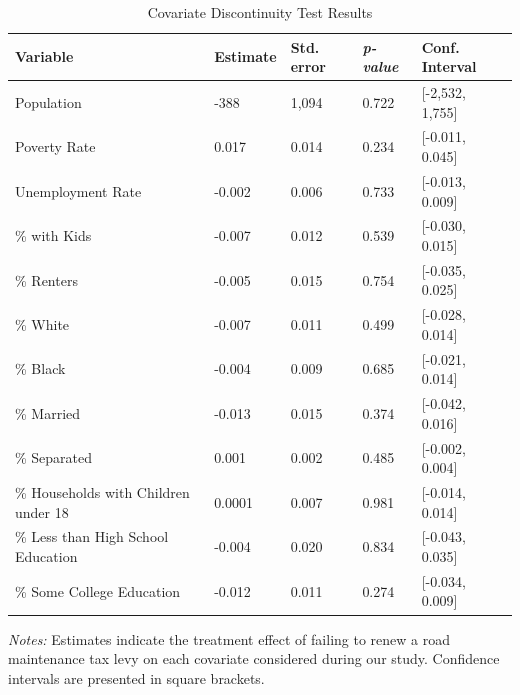 \begin{table}[!h]
    \centering
    \caption{Covariate Discontinuity Test Results}
    \label{tab:covariate_discontinuity}
    \begin{tabularx}{\textwidth}{p{4cm}*{3}{X}X}
          \hline
          Variable & Estimate & Std. error & \textit{p-value} & Conf. Interval \\
          \hline
          \renewcommand{\arraystretch}{1.5}
        Population                           & -388      & 1,094   & 0.722  & [-2,532, 1,755] \\
        Poverty Rate                         & 0.017     & 0.014   & 0.234  & [-0.011, 0.045] \\
        Unemployment Rate                 & -0.002    & 0.006   & 0.733  & [-0.013, 0.009] \\
        \% with Kids                         & -0.007    & 0.012   & 0.539  & [-0.030, 0.015] \\
        \% Renters                           & -0.005    & 0.015   & 0.754  & [-0.035, 0.025] \\
        \% White                             & -0.007    & 0.011   & 0.499  & [-0.028, 0.014] \\
        \% Black                             & -0.004    & 0.009   & 0.685  & [-0.021, 0.014] \\
        \% Married                           & -0.013    & 0.015   & 0.374  & [-0.042, 0.016] \\
        \% Separated                         & 0.001     & 0.002   & 0.485  & [-0.002, 0.004] \\
        \% Households with Children under 18 & 0.0001    & 0.007   & 0.981  & [-0.014, 0.014] \\
        \% Less than High School Education   & -0.004    & 0.020   & 0.834  & [-0.043, 0.035] \\
        \% Some College Education            & -0.012    & 0.011   & 0.274  & [-0.034, 0.009] \\
        \hline
    \end{tabularx}
    \begin{tablenotes}
        \small
        \item \textit{Notes:} Estimates indicate the treatment effect of failing to renew a road maintenance tax levy on each covariate considered during our study. Confidence intervals are presented in square brackets.
    \end{tablenotes}
\end{table}

